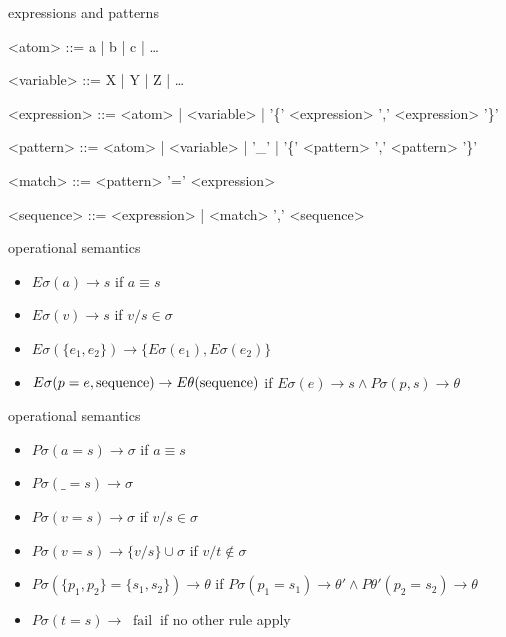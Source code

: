 \begin{frame}{expressions and patterns}

\begin{grammar}
<atom> ::= a | b | c | \ldots

<variable> ::= X | Y | Z | \ldots

<expression> ::= <atom> | <variable> | '\{' <expression> ',' <expression> '\}'

<pattern> ::= <atom> | <variable> | '\_' | '\{' <pattern> ',' <pattern> '\}'

<match> ::=  <pattern> '=' <expression>

<sequence> ::=  <expression> | <match> ',' <sequence>
\end{grammar}
\end{frame}

\begin{frame}{operational semantics}

 \begin{itemize}
   \pause \item $E\sigma(a) \rightarrow s$ if $a \equiv s$ 
   \pause \item $E\sigma(v) \rightarrow s$ if $v/s \in \sigma$
   \pause \item $E\sigma(\lbrace e_1 , e_2\rbrace) \rightarrow \lbrace E\sigma(e_1), E\sigma(e_2) \rbrace$
 \end{itemize}

\begin{itemize}
  \pause \item $E\sigma(p = e, {\rm sequence}) \rightarrow E\theta({\rm sequence})$ if  $E\sigma(e) \rightarrow s \wedge P\sigma(p, s) \rightarrow \theta$
\end{itemize}

\end{frame}

\begin{frame}{operational semantics}

\pause
\begin{itemize}
  \pause \item $P\sigma(a = s) \rightarrow \sigma$  if  $a \equiv s$
  \pause \item $P\sigma(\_ = s) \rightarrow \sigma$  
  \pause \item $P\sigma(v = s) \rightarrow \sigma$  if \pause $ v/s \in \sigma $
  \pause \item $P\sigma(v = s) \rightarrow \lbrace v/s \rbrace \cup \sigma$ if \pause $ v/t \not\in \sigma$
  \pause \item $P\sigma(\lbrace p_1, p_2 \rbrace  = \lbrace s_1, s_2 \rbrace) \rightarrow \theta$ if
      $P\sigma(p_1 = s_1) \rightarrow \theta' \wedge P\theta'(p_2 = s_2) \rightarrow \theta$
\end{itemize}
\pause
\begin{itemize}
  \pause \item $P\sigma(t = s) \rightarrow$ \pause $\  \mathrm{fail}\ $ if no other rule apply
\end{itemize}

\end{frame}


